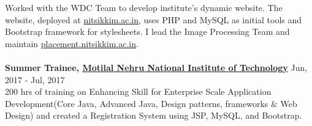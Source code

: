 \documentclass[margin, centered]{res}
\begin{document}
\begin{resume}
            Worked with the WDC Team to develop institute's dynamic website. The website, deployed at
            \href{https://www.nitsikkim.ac.in}{nitsikkim.ac.in}, uses PHP and MySQL as initial tools
            and Bootstrap framework for stylesheets. I lead the Image Processing Team and maintain
            \href{https://placement.nitsikkim.ac.in}{placement.nitsikkim.ac.in}. \\
            \\
            \textbf{Summer Trainee, \href{http://www.mnnit.ac.in/}{Motilal Nehru National Institute of Technology}} \hfill Jun, 2017 - Jul, 2017 \\
            200 hrs of training on Enhancing Skill for Enterprise Scale Application Development(Core
            Java, Advanced Java, Design patterns, frameworks \& Web Design) and created a Registration
            System using JSP, MySQL, and Bootstrap.



\end{resume}
\end{document}
